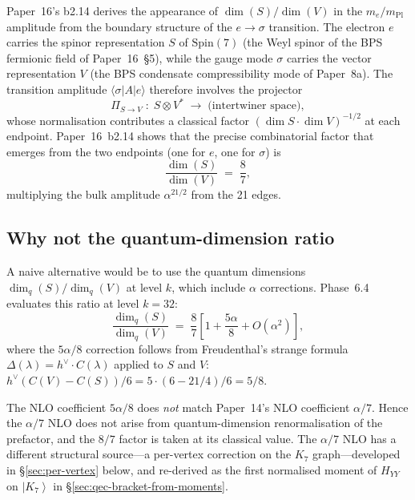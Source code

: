 \documentclass[11pt]{article}
\newcommand{\Spin}{\mathrm{Spin}}
\newcommand{\dimq}{\dim_q}
\newcommand{\ket}[1]{\left|#1\right\rangle}
\newcommand{\mPl}{m_{\mathrm{Pl}}}
\newcommand{\hv}{h^{\vee}}
\begin{document}
Paper~16's b2.14 derives the appearance of $\dim(S)/\dim(V)$ in
the $m_e/\mPl$ amplitude from the boundary structure of the
$e \to \sigma$ transition.  The electron $e$ carries the spinor
representation $S$ of $\Spin(7)$ (the Weyl spinor of the BPS
fermionic field of Paper~16~\S5), while the gauge mode $\sigma$
carries the vector representation $V$ (the BPS condensate
compressibility mode of Paper~8a).  The transition amplitude
$\langle \sigma | A | e \rangle$ therefore involves the
projector
\begin{equation}
  \Pi_{S \to V}
  \;:\; S \otimes V^* \;\to\; \text{(intertwiner space)},
\end{equation}
whose normalisation contributes a classical factor
$(\dim S \cdot \dim V)^{-1/2}$ at each endpoint.  Paper~16~b2.14
shows that the precise combinatorial factor that emerges from
the two endpoints (one for $e$, one for $\sigma$) is
\begin{equation}
  \frac{\dim(S)}{\dim(V)} \;=\; \frac{8}{7},
\end{equation}
multiplying the bulk amplitude $\alpha^{21/2}$ from the 21 edges.

\subsection{Why not the quantum-dimension ratio}

A naive alternative would be to use the quantum dimensions
$\dimq(S)/\dimq(V)$ at level $k$, which include $\alpha$
corrections.  Phase~6.4 evaluates this ratio at level $k = 32$:
\begin{equation}
  \frac{\dimq(S)}{\dimq(V)}
  \;=\; \frac{8}{7}
        \left[1 + \frac{5\alpha}{8} + O(\alpha^2)\right],
\end{equation}
where the $5\alpha/8$ correction follows from Freudenthal's strange
formula
$\Delta(\lambda) = \hv \cdot C(\lambda)$ applied to $S$ and $V$:
$\hv (C(V) - C(S))/6 = 5 \cdot (6 - 21/4)/6 = 5/8$.

The NLO coefficient $5\alpha/8$ does \emph{not} match Paper~14's
NLO coefficient $\alpha/7$.  Hence the $\alpha/7$ NLO does not
arise from quantum-dimension renormalisation of the prefactor,
and the $8/7$ factor is taken at its classical value.  The
$\alpha/7$ NLO has a different structural source---a per-vertex
correction on the $K_7$ graph---developed in
\S\ref{sec:per-vertex} below, and re-derived as the first normalised
moment of $H_{YY}$ on $\ket{K_7}$ in \S\ref{sec:qec-bracket-from-moments}.
\end{document}
